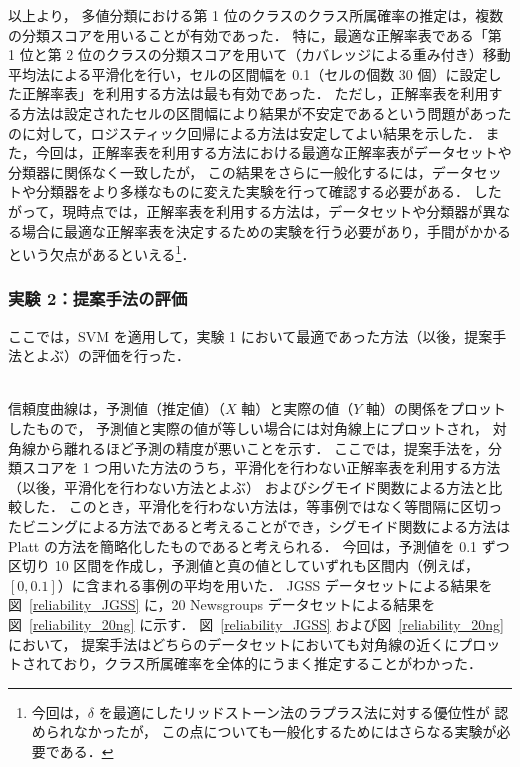 \documentclass[japanese]{jnlp_1.4}
\begin{document}
\begin{table}[t]
\begin{center}
\label{loglikelihoodNS_NB}

\end{center}
\end{table}

以上より，
多値分類における第 1 位のクラスのクラス所属確率の推定は，複数の分類スコアを用いることが有効であった．
特に，最適な正解率表である「第 1 位と第 2 位のクラスの分類スコアを用いて（カバレッジによる重み付き）移動平均法による平滑化を行い，セルの区間幅を 0.1（セルの個数 30 個）に設定した正解率表」を利用する方法は最も有効であった．
ただし，正解率表を利用する方法は設定されたセルの区間幅により結果が不安定であるという問題があったのに対して，ロジスティック回帰による方法は安定してよい結果を示した．
また，今回は，正解率表を利用する方法における最適な正解率表がデータセットや分類器に関係なく一致したが，
この結果をさらに一般化するには，データセットや分類器をより多様なものに変えた実験を行って確認する必要がある．  
したがって，現時点では，正解率表を利用する方法は，データセットや分類器が異なる場合に最適な正解率表を決定するための実験を行う必要があり，手間がかかるという欠点があるといえる\footnote{
	今回は，$\delta$ を最適にしたリッドストーン法のラプラス法に対する優位性が
	認められなかったが，
	この点についても一般化するためにはさらなる実験が必要である．
}．

\subsubsection{実験 2：提案手法の評価}

ここでは，SVM を適用して，実験 1 において最適であった方法（以後，提案手法とよぶ）の評価を行った．\\\\

信頼度曲線は，予測値（推定値）（$X$ 軸）と実際の値（$Y$ 軸）の関係をプロットしたもので，
予測値と実際の値が等しい場合には対角線上にプロットされ，
対角線から離れるほど予測の精度が悪いことを示す．
ここでは，提案手法を，分類スコアを 1 つ用いた方法のうち，平滑化を行わない正解率表を利用する方法（以後，平滑化を行わない方法とよぶ）
およびシグモイド関数による方法と比較した．
このとき，平滑化を行わない方法は，等事例ではなく等間隔に区切ったビニングによる方法であると考えることができ，シグモイド関数による方法は Platt の方法を簡略化したものであると考えられる．
今回は，予測値を 0.1 ずつ区切り 10 区間を作成し，予測値と真の値としていずれも区間内（例えば，$[0,0.1]$）に含まれる事例の平均を用いた．
JGSS データセットによる結果を図~\ref{reliability_JGSS} に，20 Newsgroups データセットによる結果を図~\ref{reliability_20ng} に示す．
図~\ref{reliability_JGSS} および図~\ref{reliability_20ng} において，
提案手法はどちらのデータセットにおいても対角線の近くにプロットされており，クラス所属確率を全体的にうまく推定することがわかった．
\end{document}
